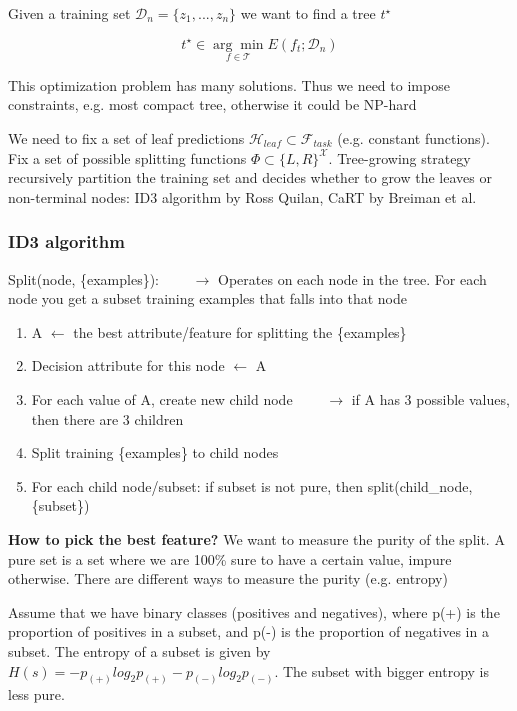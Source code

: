 \documentclass{article}
\begin{document}
\bigskip

\raggedright Given a training set \(\mathcal{D}_n = \{z_1, ..., z_n\}\) we want to find a tree \(t^{\star}\)

\[t^\star \in  \underset{f \in \mathcal{T}}{\arg\min}E(f_t; \mathcal{D}_n)\]

This optimization problem has many solutions. Thus we need to impose constraints, e.g. most compact tree, otherwise it could be NP-hard

We need to fix a set of leaf predictions \(\mathcal{H}_{leaf} \subset \mathcal{F}_{task}\) (e.g.
constant functions). Fix a set of possible splitting functions \(\Phi \subset\{L, R\}^\mathcal{X}\). Tree-growing strategy recursively partition the training set and decides whether to grow the leaves or non-terminal nodes: ID3 algorithm by Ross Quilan, CaRT by Breiman et al.




\subsubsection*{ID3 algorithm}

Split(node, \{examples\}): \(\qquad\longrightarrow\) Operates on each node in the tree. For each node you get a subset training examples that falls into that node
\begin{enumerate}
	\item A $\leftarrow$ the best attribute/feature for splitting the \{examples\}
	\item Decision attribute for this node  $\leftarrow$ A
	\item For each value of A, create new child node \(\qquad \longrightarrow\) if A has 3 possible values, then there are 3 children
	\item Split training \{examples\} to child nodes
	\item For each child node/subset: if subset is not pure, then split(child\_node, \{subset\})
\end{enumerate}


\textbf{How to pick the best feature?} We want to measure the purity of the split. A pure set is a set where we are 100\% sure to have a certain value, impure otherwise. There are different ways to measure the purity (e.g. entropy)

Assume that we have binary classes (positives and negatives), where p(+) is the proportion of positives in a subset, and p(-) is the proportion of negatives in a subset. The entropy of a subset is given by \(H(s) = - p_{(+)}log_2p_{(+)} - p_{(-)}log_2p_{(-)}\). The subset with bigger entropy is less pure.
\end{document}
